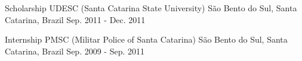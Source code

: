 \begin{cventries}
  \cventry
    {Scholarship} %
    {UDESC (Santa Catarina State University)} %
    {São Bento do Sul, Santa Catarina, Brazil} %
    {Sep. 2011 - Dec. 2011} %
    {
    }

  \cventry
    {Internship} %
    {PMSC (Militar Police of Santa Catarina)} %
    {São Bento do Sul, Santa Catarina, Brazil} %
    {Sep. 2009 - Sep. 2011} %
    {
    }

\end{cventries}
